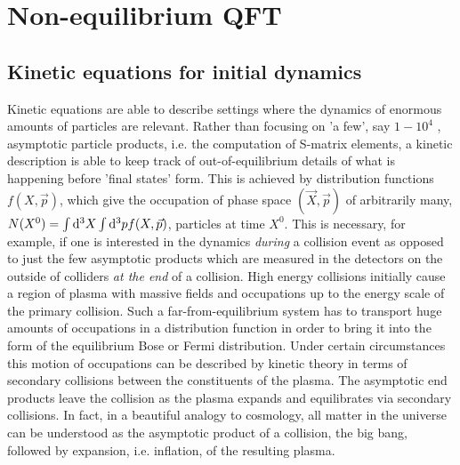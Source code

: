 
\chapter{Non-equilibrium QFT}
\label{ch:noneqQFT}

\section{Kinetic equations for initial dynamics}
Kinetic equations are able to describe settings where the dynamics of enormous amounts of particles are relevant. Rather than focusing on ’a few’, say $1 − 10^4$ , asymptotic particle products, i.e. the
computation of S-matrix elements, a kinetic description is able to keep track of out-of-equilibrium details
of what is happening before ’final states’ form. This is achieved by distribution functions $f (X, \vec{p} )$, which give the occupation of phase space
$(\vec{X},\vec{p})$ of arbitrarily many, $N (X^0 ) = \int \mathrm{d}^3 X \int \mathrm{d}^3 p f (X, \vec{p} )$, particles at time $X^0$. This is necessary, for example, if one is interested in the dynamics \emph{during} a collision event as opposed
to just the few asymptotic products which are measured in the detectors on the outside of colliders \emph{at
the end} of a collision. High energy collisions initially cause a region of plasma with massive fields and
occupations up to the energy scale of the primary collision. Such a far-from-equilibrium system has to
transport huge amounts of occupations in a distribution function in order to bring it into the form of
the equilibrium Bose or Fermi distribution. Under certain circumstances this motion of occupations can be described by kinetic theory in terms of secondary
collisions between the constituents of the plasma. The asymptotic end products leave the collision as the
plasma expands and equilibrates via secondary collisions. In fact, in a beautiful analogy to cosmology, all matter in the universe can be understood as the asymptotic product of a collision, the big bang,
followed by expansion, i.e. inflation, of the resulting plasma.
